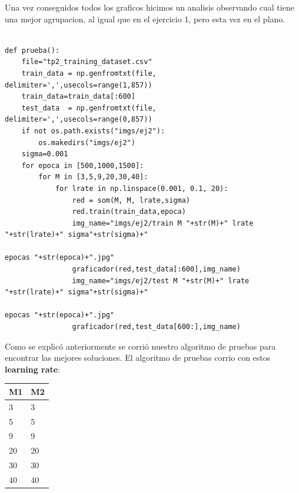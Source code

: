 Una vez conseguidos todos los graficos hicimos un analisis observando cual tiene una mejor agrupacion, al igual que en el ejercicio 1, pero esta vez en el plano.


\begin{lstlisting}[caption=pruebas]
	
def prueba():
	file="tp2_training_dataset.csv"
	train_data = np.genfromtxt(file, delimiter=',',usecols=range(1,857))
	train_data=train_data[:600]
	test_data  = np.genfromtxt(file, delimiter=',',usecols=range(0,857))
	if not os.path.exists("imgs/ej2"):
		os.makedirs("imgs/ej2")
	sigma=0.001
	for epoca in [500,1000,1500]:
		for M in [3,5,9,20,30,40]:
			for lrate in np.linspace(0.001, 0.1, 20):
				red = som(M, M, lrate,sigma)
				red.train(train_data,epoca)
				img_name="imgs/ej2/train M "+str(M)+" lrate "+str(lrate)+" sigma"+str(sigma)+" 
				                                                    epocas "+str(epoca)+".jpg"
				graficador(red,test_data[:600],img_name)
				img_name="imgs/ej2/test M "+str(M)+" lrate "+str(lrate)+" sigma"+str(sigma)+" 
				                                                   epocas "+str(epoca)+".jpg"
				graficador(red,test_data[600:],img_name)

\end{lstlisting}

Como se explic\'o anteriormente se corri\'o nuestro algoritmo de pruebas para encontrar las mejores soluciones. El algoritmo de pruebas corrio con estos \textbf{learning rate}:

\begin{tabular}{|l|l|}
\hline
M1 & M2 \\ \hline
3 & 3 \\ \hline
5 & 5 \\ \hline
9 & 9 \\ \hline
20 & 20 \\ \hline
30 & 30 \\ \hline
40 & 40 \\ \hline
\end{tabular}


